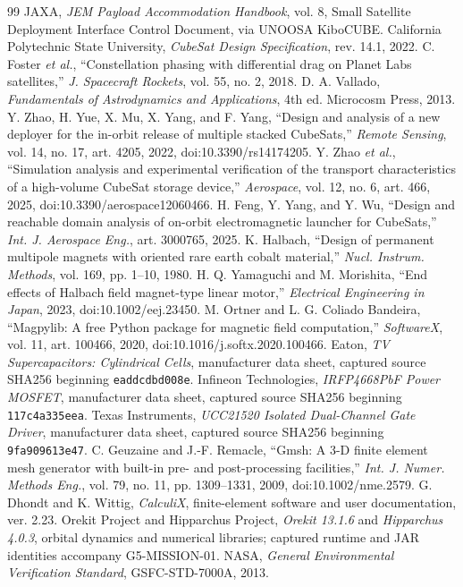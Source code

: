\documentclass[conference,a4paper]{IEEEtran}
\begin{document}
\begin{thebibliography}{99}
 JAXA, \emph{JEM Payload Accommodation Handbook}, vol. 8, Small Satellite Deployment Interface Control Document, via UNOOSA KiboCUBE.
 California Polytechnic State University, \emph{CubeSat Design Specification}, rev. 14.1, 2022.
 C. Foster \emph{et al.}, ``Constellation phasing with differential drag on Planet Labs satellites,'' \emph{J. Spacecraft Rockets}, vol. 55, no. 2, 2018.
 D. A. Vallado, \emph{Fundamentals of Astrodynamics and Applications}, 4th ed. Microcosm Press, 2013.
 Y. Zhao, H. Yue, X. Mu, X. Yang, and F. Yang, ``Design and analysis of a new deployer for the in-orbit release of multiple stacked CubeSats,'' \emph{Remote Sensing}, vol. 14, no. 17, art. 4205, 2022, doi:10.3390/rs14174205.
 Y. Zhao \emph{et al.}, ``Simulation analysis and experimental verification of the transport characteristics of a high-volume CubeSat storage device,'' \emph{Aerospace}, vol. 12, no. 6, art. 466, 2025, doi:10.3390/aerospace12060466.
 H. Feng, Y. Yang, and Y. Wu, ``Design and reachable domain analysis of on-orbit electromagnetic launcher for CubeSats,'' \emph{Int. J. Aerospace Eng.}, art. 3000765, 2025.
 K. Halbach, ``Design of permanent multipole magnets with oriented rare earth cobalt material,'' \emph{Nucl. Instrum. Methods}, vol. 169, pp. 1--10, 1980.
 H. Q. Yamaguchi and M. Morishita, ``End effects of Halbach field magnet-type linear motor,'' \emph{Electrical Engineering in Japan}, 2023, doi:10.1002/eej.23450.
 M. Ortner and L. G. Coliado Bandeira, ``Magpylib: A free Python package for magnetic field computation,'' \emph{SoftwareX}, vol. 11, art. 100466, 2020, doi:10.1016/j.softx.2020.100466.
 Eaton, \emph{TV Supercapacitors: Cylindrical Cells}, manufacturer data sheet, captured source SHA256 beginning \texttt{eaddcdbd008e}.
 Infineon Technologies, \emph{IRFP4668PbF Power MOSFET}, manufacturer data sheet, captured source SHA256 beginning \texttt{117c4a335eea}.
 Texas Instruments, \emph{UCC21520 Isolated Dual-Channel Gate Driver}, manufacturer data sheet, captured source SHA256 beginning \texttt{9fa909613e47}.
 C. Geuzaine and J.-F. Remacle, ``Gmsh: A 3-D finite element mesh generator with built-in pre- and post-processing facilities,'' \emph{Int. J. Numer. Methods Eng.}, vol. 79, no. 11, pp. 1309--1331, 2009, doi:10.1002/nme.2579.
 G. Dhondt and K. Wittig, \emph{CalculiX}, finite-element software and user documentation, ver. 2.23.
 Orekit Project and Hipparchus Project, \emph{Orekit 13.1.6} and \emph{Hipparchus 4.0.3}, orbital dynamics and numerical libraries; captured runtime and JAR identities accompany G5-MISSION-01.
 NASA, \emph{General Environmental Verification Standard}, GSFC-STD-7000A, 2013.
\end{thebibliography}
\end{document}
